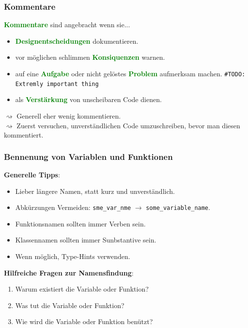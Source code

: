 \documentclass[10pt]{beamer}
\newcommand{\htgreen}[1] {{\bf \textcolor{Green}{#1}}}
\begin{document}
\begin{frame}[fragile]
  \frametitle{Kommentare}
  \htgreen{Kommentare} sind angebracht wenn sie...
  \begin{itemize}
    \item \htgreen{Designentscheidungen} dokumentieren.
    \item vor möglichen schlimmen \htgreen{Konsiquenzen} warnen.
    \item auf eine \htgreen{Aufgabe} oder nicht gelöstes
      \htgreen{Problem} aufmerksam machen.
      \texttt{#TODO: Extremly important thing}
    \item als \htgreen{Verstärkung} von unscheibaren Code dienen.
  \end{itemize}
  \vspace{0.5cm}
  $\rightsquigarrow$ Generell eher wenig kommentieren.\\
  $\rightsquigarrow$ Zuerst versuchen, unverständlichen Code umzuschreiben,
                      bevor man diesen \hspace*{0.5cm}kommentiert.

\end{frame}

\begin{frame}
  \frametitle{Bennenung von Variablen und Funktionen}
  {\bf Generelle Tipps}:
  \begin{itemize}
    \item Lieber längere Namen, statt kurz und unverständlich.
    \item Abkürzungen Vermeiden: 
      \texttt{sme_var_nme} $\rightarrow$
      \texttt{some_variable_name}.
    \item Funktionsnamen sollten immer Verben sein.
    \item Klassennamen sollten immer Sunbstantive sein.
    \item Wenn möglich, Type-Hints verwenden.
  \end{itemize}
  \vspace*{0.5cm}
  {\bf Hilfreiche Fragen zur Namensfindung}:
  \begin{enumerate}
    \item Warum existiert die Variable oder Funktion?
    \item Was tut die Variable oder Funktion?
    \item Wie wird die Variable oder Funktion benützt?
  \end{enumerate}
\end{frame}
\end{document}
